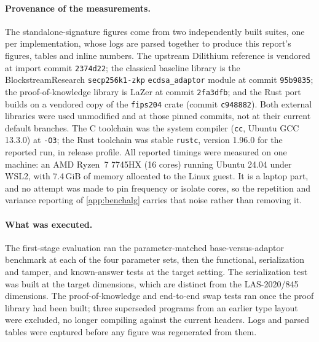 \paragraph{Provenance of the measurements.}
The standalone-signature figures come from two independently built suites, one per
implementation, whose logs are parsed together to produce this report's figures, tables and
inline numbers. The upstream Dilithium reference is vendored at import commit
\texttt{2374d22}; the classical baseline library is the BlockstreamResearch
\texttt{secp256k1-zkp} \texttt{ecdsa\_adaptor} module at commit \texttt{95b9835}; the
proof-of-knowledge library is LaZer at commit \texttt{2fa3dfb}; and the Rust port builds on
a vendored copy of the \texttt{fips204} crate (commit \texttt{c948882}). Both external
libraries were used unmodified and at those pinned commits, not at their current default
branches. The C toolchain was the system compiler (\texttt{cc}, Ubuntu GCC 13.3.0) at
\texttt{-O3}; the Rust toolchain was stable \texttt{rustc}, version 1.96.0 for the reported
run, in release profile.
All reported timings were measured on one machine: an AMD Ryzen~7 7745HX (16 cores) running
Ubuntu 24.04 under WSL2, with 7.4\,GiB of memory allocated to the Linux guest. It is a
laptop part, and no attempt was made to pin frequency or isolate cores, so the repetition
and variance reporting of \cref{app:benchalg} carries that noise rather than removing it.

\paragraph{What was executed.}
The first-stage evaluation ran the parameter-matched base-versus-adaptor benchmark at each
of the four parameter sets, then the functional, serialization and tamper, and known-answer
tests at the target setting. The serialization test was built at the target dimensions,
which are distinct from the LAS-2020/845 dimensions. The proof-of-knowledge and end-to-end swap
tests ran once the proof library had been built; three superseded programs from an earlier
type layout were excluded, no longer compiling against the current headers. Logs and parsed
tables were captured before any figure was regenerated from them.

